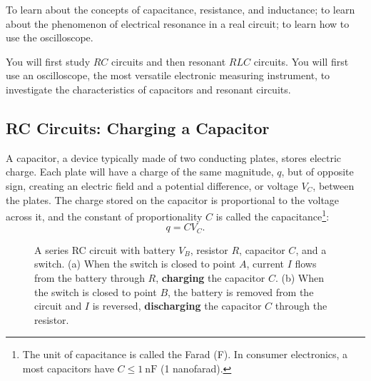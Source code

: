 \documentclass[addpoints]{physlabs}
\begin{document}
\begin{labsection}

\begin{objective}
    To learn about the concepts of capacitance, resistance, and inductance; to learn about the phenomenon of electrical resonance in a real circuit; to learn how to use the oscilloscope.
\end{objective}

\begin{theory}

    You will first study $RC$ circuits and then resonant $RLC$ circuits. You will first use an oscilloscope, the most versatile electronic measuring instrument, to investigate the characteristics of capacitors and resonant circuits.

    \subsection*{RC Circuits: Charging a Capacitor}

    A capacitor, a device typically made of two conducting plates, stores electric charge. Each plate will have a charge of the same magnitude, $q$, but of opposite sign, creating an electric field and a potential difference, or voltage $V_C$, between the plates. The charge stored on the capacitor is proportional to the voltage across it, and the constant of proportionality $C$ is called the capacitance\footnote{The unit of capacitance is called the Farad (F). In consumer electronics, a most capacitors have $C\leq\qty{1}{\nano\farad}$ (1 nanofarad).}:
    \begin{equation}\label{eq: capacitance}
        q = C V_C.
    \end{equation}

    \begin{figure}[ht]
        \centering
        
        \caption{A series RC circuit with battery $V_B$, resistor $R$, capacitor $C$, and a switch. (a) When the switch is closed to point $A$, current $I$ flows from the battery through $R$, \textbf{charging} the capacitor $C$. (b) When the switch is closed to point $B$, the battery is removed from the circuit and $I$ is reversed, \textbf{discharging} the capacitor $C$ through the resistor.}
        \label{fig: rc circuit}
    \end{figure}


\end{theory}
\end{labsection}
\end{document}
